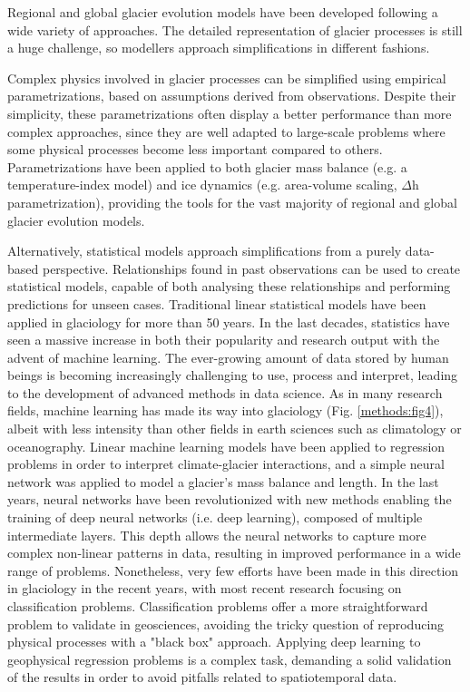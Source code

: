 Regional and global glacier evolution models have been developed following a wide variety of approaches. The detailed representation of glacier processes is still a huge challenge, so modellers approach simplifications in different fashions. 

Complex physics involved in glacier processes can be simplified using empirical parametrizations, based on assumptions derived from observations. Despite their simplicity, these parametrizations often display a better performance than more complex approaches, since they are well adapted to large-scale problems where some physical processes become less important compared to others. Parametrizations have been applied to both glacier mass balance (e.g. a temperature-index model) and ice dynamics (e.g. area-volume scaling, $\Delta$h parametrization), providing the tools for the vast majority of regional and global glacier evolution models.

Alternatively, statistical models approach simplifications from a purely data-based perspective. Relationships found in past observations can be used to create statistical models, capable of both analysing these relationships and performing predictions for unseen cases. Traditional linear statistical models have been applied in glaciology for more than 50 years. In the last decades, statistics have seen a massive increase in both their popularity and research output with the advent of machine learning. The ever-growing amount of data stored by human beings is becoming increasingly challenging to use, process and interpret, leading to the development of advanced methods in data science. As in many research fields, machine learning has made its way into glaciology (Fig.  \ref{methods:fig4}), albeit with less intensity than other fields in earth sciences such as climatology or oceanography. Linear machine learning models have been applied to regression problems in order to interpret climate-glacier interactions, and a simple neural network was applied to model a glacier's mass balance and length. In the last years, neural networks have been revolutionized with new methods enabling the training of deep neural networks (i.e. deep learning), composed of multiple intermediate layers. This depth allows the neural networks to capture more complex non-linear patterns in data, resulting in improved performance in a wide range of problems. Nonetheless, very few efforts have been made in this direction in glaciology in the recent years, with most recent research focusing on classification problems. Classification problems offer a more straightforward problem to validate in geosciences, avoiding the tricky question of reproducing physical processes with a "black box" approach. Applying deep learning to geophysical regression problems is a complex task, demanding a solid validation of the results in order to avoid pitfalls related to spatiotemporal data. 

